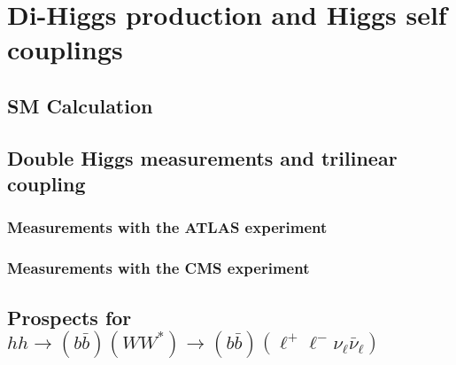 \documentclass[../report.tex]{subfiles}
\providecommand{\main}{..}
\begin{document}
\section{Di-Higgs production and Higgs self couplings}

\subsection{SM Calculation}










\subsection{Double Higgs measurements and trilinear coupling}

\subsubsection{Measurements with the ATLAS experiment}



\subsubsection{Measurements with the CMS experiment}



\subsection{Prospects for $hh \to (b \bar b)(WW^*) \to (b \bar b)( \ell^+\ell^- \nu_\ell \bar\nu_\ell)$}






\end{document}
